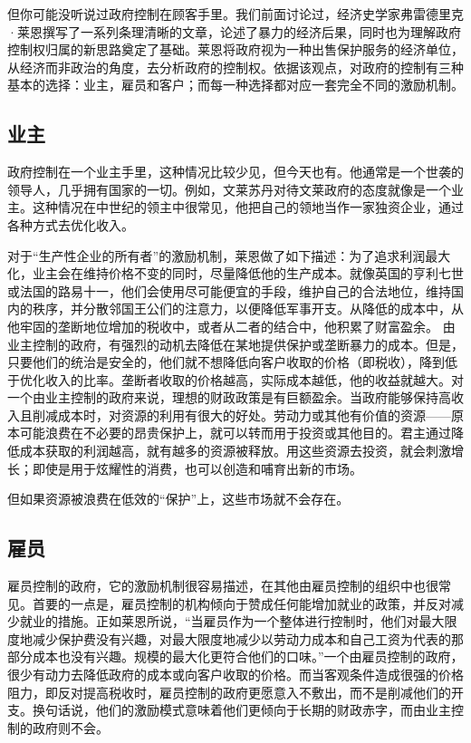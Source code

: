 但你可能没听说过政府控制在顾客手里。我们前面讨论过，经济史学家弗雷德里克·莱恩撰写了一系列条理清晰的文章，论述了暴力的经济后果，同时也为理解政府控制权归属的新思路奠定了基础。莱恩将政府视为一种出售保护服务的经济单位，从经济而非政治的角度，去分析政府的控制权。依据该观点，对政府的控制有三种基本的选择：业主，雇员和客户；而每一种选择都对应一套完全不同的激励机制。

\subsection{业主}
政府控制在一个业主手里，这种情况比较少见，但今天也有。他通常是一个世袭的领导人，几乎拥有国家的一切。例如，文莱苏丹对待文莱政府的态度就像是一个业主。这种情况在中世纪的领主中很常见，他把自己的领地当作一家独资企业，通过各种方式去优化收入。

对于“生产性企业的所有者”的激励机制，莱恩做了如下描述：为了追求利润最大化，业主会在维持价格不变的同时，尽量降低他的生产成本。就像英国的亨利七世或法国的路易十一，他们会使用尽可能便宜的手段，维护自己的合法地位，维持国内的秩序，并分散邻国王公们的注意力，以便降低军事开支。从降低的成本中，从他牢固的垄断地位增加的税收中，或者从二者的结合中，他积累了财富盈余。 由业主控制的政府，有强烈的动机去降低在某地提供保护或垄断暴力的成本。但是，只要他们的统治是安全的，他们就不想降低向客户收取的价格（即税收），降到低于优化收入的比率。垄断者收取的价格越高，实际成本越低，他的收益就越大。对一个由业主控制的政府来说，理想的财政政策是有巨额盈余。当政府能够保持高收入且削减成本时，对资源的利用有很大的好处。劳动力或其他有价值的资源——原本可能浪费在不必要的昂贵保护上，就可以转而用于投资或其他目的。君主通过降低成本获取的利润越高，就有越多的资源被释放。用这些资源去投资，就会刺激增长；即使是用于炫耀性的消费，也可以创造和哺育出新的市场。

但如果资源被浪费在低效的“保护”上，这些市场就不会存在。

\subsection{雇员}
雇员控制的政府，它的激励机制很容易描述，在其他由雇员控制的组织中也很常见。首要的一点是，雇员控制的机构倾向于赞成任何能增加就业的政策，并反对减少就业的措施。正如莱恩所说，“当雇员作为一个整体进行控制时，他们对最大限度地减少保护费没有兴趣，对最大限度地减少以劳动力成本和自己工资为代表的那部分成本也没有兴趣。规模的最大化更符合他们的口味。”一个由雇员控制的政府，很少有动力去降低政府的成本或向客户收取的价格。而当客观条件造成很强的价格阻力，即反对提高税收时，雇员控制的政府更愿意入不敷出，而不是削减他们的开支。换句话说，他们的激励模式意味着他们更倾向于长期的财政赤字，而由业主控制的政府则不会。

